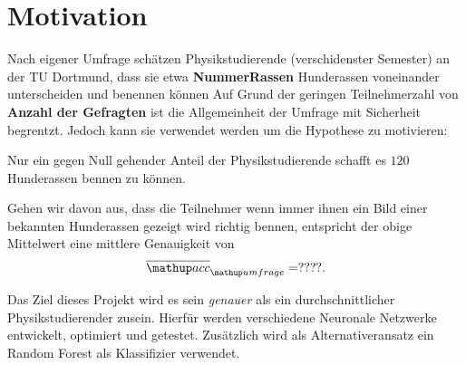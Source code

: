 \setcounter{page}{1}
\section*{Motivation}
Nach eigener Umfrage schätzen Physikstudierende (verschidenster Semester)
an der TU Dortmund, dass sie etwa \textbf{NummerRassen} Hunderassen voneinander
unterscheiden und benennen können
Auf Grund der geringen Teilnehmerzahl von \textbf{Anzahl der Gefragten}
ist die Allgemeinheit der Umfrage mit Sicherheit begrentzt. Jedoch kann sie
verwendet werden um die Hypothese zu motivieren:
\begin{center}
  Nur ein gegen Null gehender Anteil der Physikstudierende schafft es $120$
  Hunderassen bennen zu können.
\end{center}
Gehen wir davon aus, dass die Teilnehmer wenn immer ihnen ein Bild einer bekannten
Hunderassen gezeigt wird richtig bennen, entspricht der obige Mittelwert eine
mittlere Genauigkeit von
\begin{equation}
  \label{eq:umfrage_mittlere_genauigkeit}
  \ov{\map{acc}}\ua{umfrage} = ????.
\end{equation}

Das Ziel dieses Projekt wird es sein \emph{genauer} als ein durchschnittlicher
Physikstudierender zusein.
Hierfür werden verschiedene Neuronale Netzwerke entwickelt, optimiert und getestet.
Zusätzlich wird als Alternativeransatz ein Random Forest als Klassifizier verwendet.
